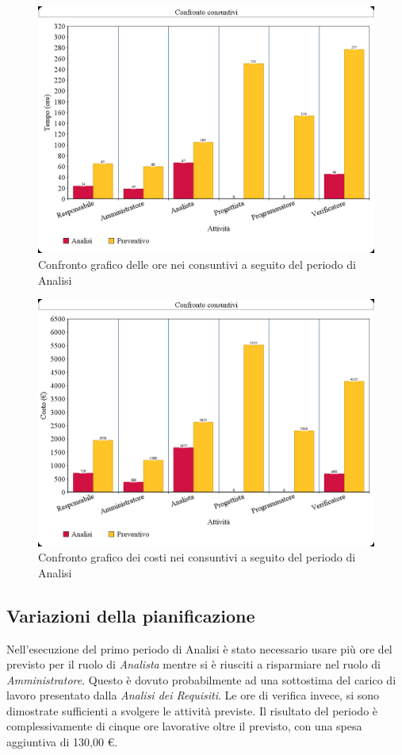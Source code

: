 \documentclass[./PianodiProgetto.tex]{subfiles}
\begin{document}
\begin{figure}[H]
	\centering
	\includegraphics[width=1\linewidth]{img/grafici/OreConsuntivo/consuntivo-ore-analisi}
	\caption{Confronto grafico delle ore nei consuntivi a seguito del periodo di Analisi}
	\label{fig:consuntivo-ore-analisi}
\end{figure}

\begin{figure}[H]
	\centering
	\includegraphics[width=1\linewidth]{img/grafici/CostiConsuntivi/consuntivo-costo-analisi}
	\caption{Confronto grafico dei costi nei consuntivi a seguito del periodo di Analisi}
	\label{fig:consuntivo-costi-analisi}
\end{figure}

\subsection{Variazioni della pianificazione}
Nell'esecuzione del primo periodo di Analisi è stato necessario usare più
ore del previsto per il ruolo di \textit{Analista} mentre si è riusciti a risparmiare nel ruolo di \textit{Amministratore}. Questo è dovuto
probabilmente ad una sottostima del carico di lavoro presentato dalla \textit{Analisi
dei Requisiti}. Le ore di verifica invece, si sono dimostrate sufficienti a svolgere
le attività previste. Il risultato del periodo è complessivamente di cinque ore
lavorative oltre il previsto, con una spesa aggiuntiva di 130,00 \euro{}.
\end{document}
